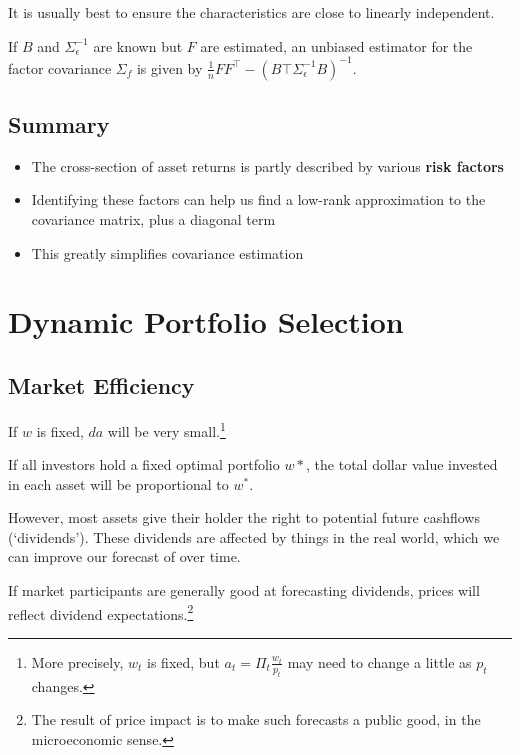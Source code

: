 \documentclass{article}
\newcommand{\sectionquote}[1]{\def\insertsquote{#1}}
\newcommand{\insertsquote}{}
\renewcommand{\insertsquote}{}%
\begin{document}
It is usually best to ensure the characteristics are close to linearly independent.

If $B$ and $\Sigma_\epsilon^{-1}$ are known but $F$ are estimated, an unbiased estimator for the factor covariance $\Sigma_f$ is given by $\frac{1}{n}F F^\top - (B\top \Sigma_\epsilon^{-1} B)^{-1}$.%

\subsection{Summary}
\begin{itemize}
	\item The cross-section of asset returns is partly described by various \textbf{risk factors}
	\item Identifying these factors can help us find a low-rank approximation to the covariance matrix, plus a diagonal term
	\item This greatly simplifies covariance estimation
\end{itemize}

\sectionquote{``Values which do not `yet' exist, except as probabilistic estimations, or risk structures, acquire a power of command over economic (and therefore social) processes, necessarily devalorizing the actual.'' Nick Land, Teleoplexy}
\section{Dynamic Portfolio Selection}
\subsection{Market Efficiency}
If $w$ is fixed, $da$ will be very small.\footnote{More precisely, $w_t$ is fixed, but $a_t=\Pi_t \frac{w_t}{p_t}$ may need to change a little as $p_t$ changes.}

If all investors hold a fixed optimal portfolio $w*$, the total dollar value invested in each asset will be proportional to $w^*$.

However, most assets give their holder the right to potential future cashflows (`dividends'). 
These dividends are affected by things in the real world, which we can improve our forecast of over time.

If market participants are generally good at forecasting dividends, prices will reflect dividend expectations.\footnote{The result of price impact is to make such forecasts a public good, in the microeconomic sense.}
\end{document}
